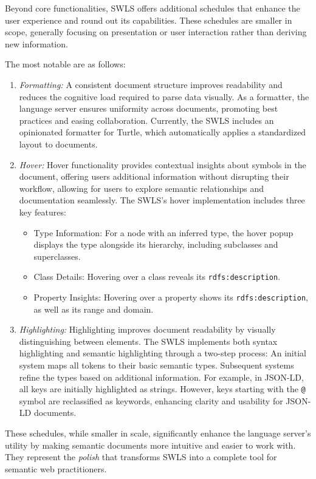 Beyond core functionalities, SWLS offers additional schedules that enhance the user experience and round out its capabilities.
These schedules are smaller in scope, generally focusing on presentation or user interaction rather than deriving new information.

The most notable are as follows:
\begin{enumerate}
  \item \textit{Formatting:}
    A consistent document structure improves readability and reduces the cognitive load required to parse data visually.
    As a formatter, the language server ensures uniformity across documents, promoting best practices and easing collaboration.
    Currently, the SWLS includes an opinionated formatter for Turtle, which automatically applies a standardized layout to documents.

  \item \textit{Hover:}
    Hover functionality provides contextual insights about symbols in the document, offering users additional information without disrupting their workflow,
    allowing for users to explore semantic relationships and documentation seamlessly.
    The SWLS’s hover implementation includes three key features:
    \begin{itemize}
      \item Type Information: For a node with an inferred type, the hover popup displays the type alongside its hierarchy, including subclasses and superclasses.
      \item Class Details: Hovering over a class reveals its \texttt{rdfs:description}.
      \item Property Insights: Hovering over a property shows its \texttt{rdfs:description}, as well as its range and domain.
    \end{itemize}

  \item \textit{Highlighting:}
    Highlighting improves document readability by visually distinguishing between elements.
    The SWLS implements both syntax highlighting and semantic highlighting through a two-step process:
        An initial system maps all tokens to their basic semantic types.
        Subsequent systems refine the types based on additional information.
    For example, in JSON-LD, all keys are initially highlighted as strings.
    However, keys starting with the \texttt{@} symbol are reclassified as keywords, enhancing clarity and usability for JSON-LD documents.
\end{enumerate}

These schedules, while smaller in scale, significantly enhance the language server’s utility by making semantic documents more intuitive and easier to work with.
They represent the \textit{polish} that transforms SWLS into a complete tool for semantic web practitioners.

